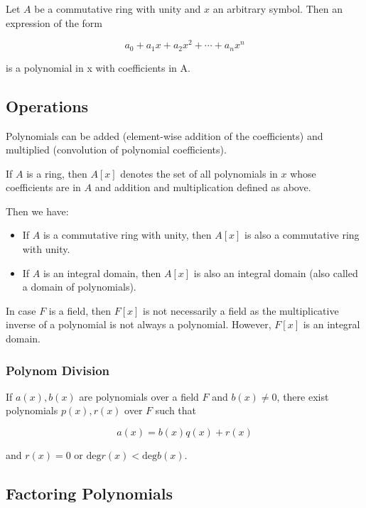 
Let \(A\) be a commutative ring with unity and \(x\) an arbitrary
symbol. Then an expression of the form

\[
a_0 + a_1 x + a_2 x^2 + \cdots + a_n x^n
\]

is a polynomial in x with coefficients in A.

\subsection{Operations}\label{operations}

Polynomials can be added (element-wise addition of the coefficients) and
multiplied (convolution of polynomial coefficients).

If \(A\) is a ring, then \(A[x]\) denotes the set of all polynomials in
\(x\) whose coefficients are in \(A\) and addition and multiplication
defined as above.

Then we have:

\begin{itemize}
\item
  If \(A\) is a commutative ring with unity, then \(A[x]\) is also a
  commutative ring with unity.
\item
  If \(A\) is an integral domain, then \(A[x]\) is also an integral
  domain (also called a domain of polynomials).
\end{itemize}

In case \(F\) is a field, then \(F[x]\) is not necessarily a field as
the multiplicative inverse of a polynomial is not always a polynomial.
However, \(F[x]\) is an integral domain.

\subsubsection{Polynom Division}\label{polynom-division}

If \(a(x), b(x)\) are polynomials over a field \(F\) and
\(b(x) \neq 0\), there exist polynomials \(p(x), r(x)\) over \(F\) such
that

\[
a(x) = b(x) q(x) + r(x)
\]

and \(r(x)=0\) or \(\text{deg} r(x) < \text{deg} b(x)\).

\subsection{Factoring Polynomials}\label{factoring-polynomials}

